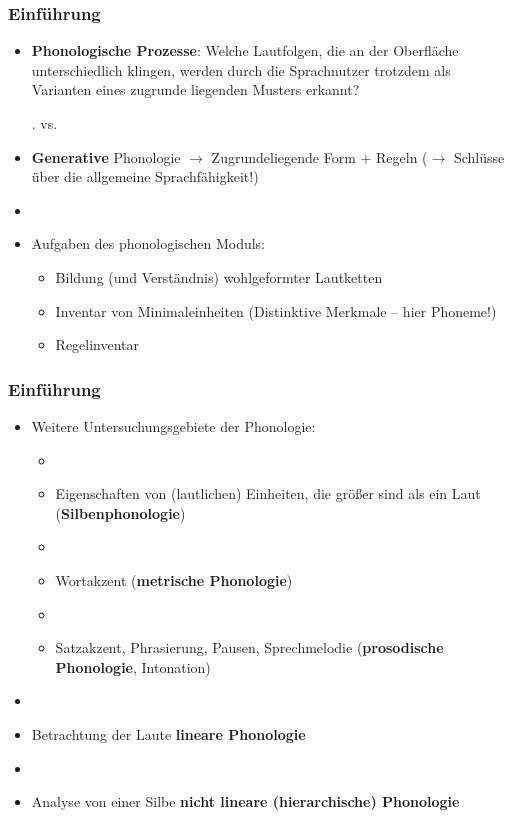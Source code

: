 
\begin{frame}
\frametitle{Einführung}

\begin{itemize}
	\item \textbf{Phonologische Prozesse}: Welche Lautfolgen, die an der Oberfläche unterschiedlich klingen, werden durch die Sprachnutzer trotzdem als Varianten eines zugrunde liegenden Musters erkannt?

\ex. \textipa{[ga\;Rt@n]} vs. 
\textipa{[ga:d\textsyllabic{n}]}

	\item \textbf{Generative} Phonologie $\rightarrow$ Zugrundeliegende Form +  Regeln ($\rightarrow$ Schlüsse über die allgemeine Sprachfähigkeit!) 
	\item[]
	\item Aufgaben des phonologischen Moduls:
	
	\begin{itemize}
		\item Bildung (und Verständnis) wohlgeformter Lautketten
		\item Inventar von Minimaleinheiten (Distinktive Merkmale -- hier Phoneme!)
		\item Regelinventar
	\end{itemize}
	 
\end{itemize}

\end{frame}




\begin{frame}
\frametitle{Einführung}

\begin{itemize}
	\item Weitere Untersuchungsgebiete der Phonologie:
	
	\begin{itemize}
		\item[]
		\item Eigenschaften von (lautlichen) Einheiten, die größer sind als ein Laut (\zB \textbf{Silbenphonologie})
		\item[]
		\item Wortakzent (\textbf{metrische Phonologie})
		\item[]
		\item Satzakzent, Phrasierung, Pausen, Sprechmelodie (\textbf{prosodische Phonologie}, Intonation)
	\end{itemize}
	
	\item[]
	\item Betrachtung der Laute \ras \textbf{lineare Phonologie}
	\item[]
	\item Analyse von einer Silbe \ras \textbf{nicht lineare (hierarchische) Phonologie}
\end{itemize}

\end{frame}



